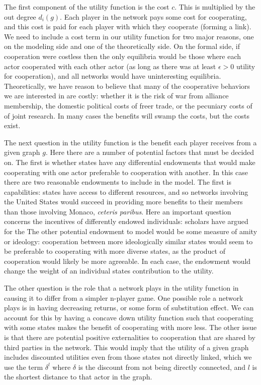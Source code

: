 \documentclass[12pt,onesided,fullpage]{amsart}
\begin{document}
The first component of the utility function is the cost $c$. This is multiplied by the out degree $d_{i}(g)$. Each player in the network pays some cost for cooperating, and this cost is paid for each player with which they cooperate (forming a link). We need to include a cost term in our utility function for two major reasons, one on the modeling side and one of the theoretically side. On the formal side, if cooperation were costless then the only equilibria would be those where each actor cooperated with each other actor (as long as there was at least $\epsilon>0$ utility for cooperation), and all networks would have uninteresting equilibria. Theoretically, we have reason to believe that many of the cooperative behaviors we are interested in are costly: whether it is the risk of war from alliance membership, the domestic political costs of freer trade, or the pecuniary costs of of joint research. In many cases the benefits will swamp the costs, but the costs exist.

The next question in the utility function is the benefit each player receives from a given graph $g$. Here there are a number of potential factors that must be decided on. The first is whether states have any differential endowments that would make cooperating with one actor preferable to cooperation with another. In this case there are two reasonable endowments to include in the model. The first is capabilities: states have access to different resources, and so networks involving the United States would succeed in providing more benefits to their members than those involving Monaco, \emph{ceteris paribus}. Here an important question concerns the incentives of differently endowed individuals: scholars have argued for the  The other potential endowment to model would be some measure of amity or ideology: cooperation between more ideologically similar states would seem to be preferable to cooperating with more diverse states, as the product of cooperation would likely be more agreeable. In each case, the endowment would change the weight of an individual states contribution to the utility. 

The other question is the role that a network plays in the utility function in causing it to differ from a simpler n-player game. One possible role a network plays is in having decreasing returns, or some form of substitution effect. We can account for this by having a concave down utility function such that cooperating with some states makes the benefit of cooperating with more less. The other issue is that there are potential positive externalities to cooperation that are shared by third parties in the network. This would imply that the utility of a given graph includes discounted utilities even from those states not directly linked, which we use the term $\delta^{l}$ where $\delta$ is the discount from not being directly connected, and $l$ is the shortest distance to that actor in the graph.
\end{document}
